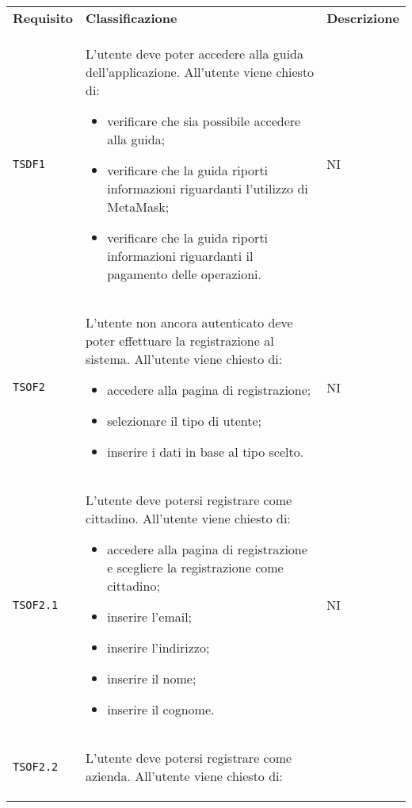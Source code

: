 \begin{table}[H]
	\renewcommand{\arraystretch}{1.5}
	\caption{Riepilogo Test di Accettazione}	
	\begin{longtable}{ >{\centering}p{} >{\centering}p{}
			>{\centering}p{}}%
			
		\rowcolorhead
		\textbf{\color{white}Requisito} 
		& \textbf{\color{white}Classificazione} 
		& \centering\textbf{\color{white}Descrizione}
		\tabularnewline %
		
		
		\texttt{TSDF1}	&	L'utente deve poter accedere alla guida dell'applicazione. All'utente viene
		chiesto di:
		\begin{itemize}
			\item verificare che sia possibile accedere alla guida;
			\item verificare che la guida riporti informazioni riguardanti l'utilizzo di
			MetaMask\glo{};
			\item verificare che la guida riporti informazioni riguardanti il pagamento
			delle operazioni. 
		\end{itemize}	&	NI	\tabularnewline
		\texttt{TSOF2}	&	L'utente non ancora autenticato deve poter effettuare la registrazione al
		sistema. All'utente viene chiesto di:
		\begin{itemize}
			\item accedere alla pagina di registrazione;
			\item selezionare il tipo di utente;
			\item inserire i dati in base al tipo scelto.
		\end{itemize}	&	NI	\tabularnewline
		\texttt{TSOF2.1}	&	L'utente deve potersi registrare come cittadino. All'utente viene chiesto di:
		\begin{itemize}
			\item accedere alla pagina di registrazione e scegliere la registrazione
			come cittadino;
			\item inserire l'email;
			\item inserire l'indirizzo;
			\item inserire il nome;
			\item inserire il cognome.
		\end{itemize}	&	NI	\tabularnewline
		\texttt{TSOF2.2}	&	L'utente deve potersi registrare come azienda. All'utente viene chiesto di:
		\begin{itemize}

\end{itemize}
\end{longtable}
\end{table}
